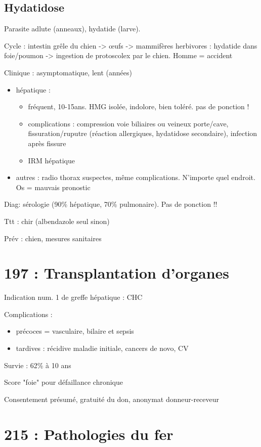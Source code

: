\documentclass[11pt]{article}
\begin{document}
\subsection{Hydatidose}
\label{sec:orgad6a46b}
Parasite adlute (anneaux), hydatide (larve).

Cycle : intestin grêle du chien -> \oe{}ufs -> mammifères herbivores : hydatide
dans foie/poumon -> ingestion de protoscolex par le chien. Homme = accident

Clinique : asymptomatique, lent (années)
\begin{itemize}
\item hépatique : 
\begin{itemize}
\item fréquent, 10-15ans. HMG isolée, indolore, bien toléré. \faBomb pas
de ponction !
\item complications : compression voie biliaires ou veineux porte/cave,
fissuration/ruputre (réaction allergiques, hydatidose secondaire),
infection après fissure
\item IRM hépatique
\end{itemize}
\item autres : radio thorax suspectes, même complications. N'importe quel
endroit. Os = mauvais pronostic
\end{itemize}

Diag: sérologie (90\% hépatique, 70\% pulmonaire). Pas de ponction !!

Ttt : chir (albendazole seul sinon)

Prév : chien, mesures sanitaires
\section{197 : Transplantation d'organes}
\label{sec:org036554a}
Indication num. 1 de greffe hépatique : CHC

Complications :
\begin{itemize}
\item précoces = vasculaire, bilaire et sepsis
\item tardives : récidive maladie initiale, cancers de novo, CV
\end{itemize}

Survie : 62\% à 10 ans

Score "foie" pour défaillance chronique

Consentement présumé, gratuité du don, anonymat donneur-receveur
\section{215 : Pathologies du fer}
\label{sec:org0a499f7}
\end{document}
